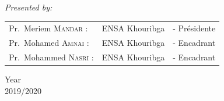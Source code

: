 \documentclass[a4paper,12pt]{report}
\begin{document}
\begin{titlepage}
\begin{center}
\vspace{2cm}


{\huge \textit{Presented by: }}\\[0.5cm]

\color{black}
\centering
\begin{tabular}{lll}
\large Pr.~Meriem \textsc{Mandar} : & \large ENSA Khouribga & \large - Présidente \\[0.1cm]
\large Pr.~Mohamed \textsc{Amnai} : & \large ENSA Khouribga & \large - Encadrant \\[0.1cm]
\large Pr.~Mohammed \textsc{Nasri} : & \large ENSA Khouribga & \large - Encadrant
\end{tabular}

\vfill

{\LARGE {Year}\\ 2019/2020}

\end{center}
\end{titlepage}
\end{document}
